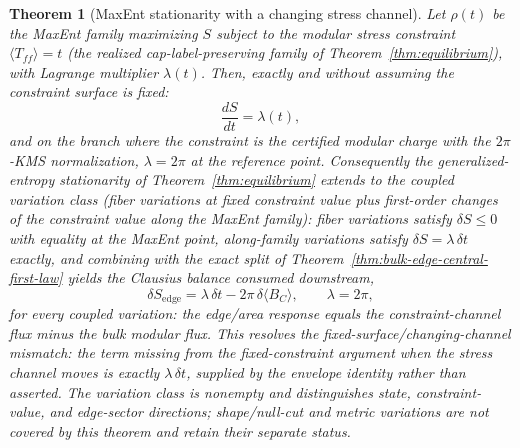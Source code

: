 \documentclass[11pt]{article}
\newtheorem{theorem}{Theorem}[section]
\begin{document}
\begin{theorem}[MaxEnt stationarity with a changing stress channel]
\label{thm:maxent-lagrange-stationarity}
Let \(\rho(t)\) be the MaxEnt family maximizing \(S\) subject to the modular
stress constraint \(\langle T_{ff}\rangle=t\) (the realized cap-label-preserving
family of Theorem~\ref{thm:equilibrium}), with Lagrange multiplier
\(\lambda(t)\). Then, exactly and without assuming the constraint surface is
fixed:
\[
\frac{dS}{dt}=\lambda(t),
\]
and on the branch where the constraint is the certified modular charge with
the \(2\pi\)-KMS normalization, \(\lambda=2\pi\) at the reference point.
Consequently the generalized-entropy stationarity of
Theorem~\ref{thm:equilibrium} extends to the \emph{coupled} variation class
(fiber variations at fixed constraint value \emph{plus} first-order changes
of the constraint value along the MaxEnt family): fiber variations satisfy
\(\delta S\leq0\) with equality at the MaxEnt point, along-family variations
satisfy \(\delta S=\lambda\,\delta t\) exactly, and combining with the exact
split of Theorem~\ref{thm:bulk-edge-central-first-law} yields the Clausius
balance consumed downstream,
\[
\delta S_{\mathrm{edge}}
=\lambda\,\delta t-2\pi\,\delta\langle B_C\rangle ,
\qquad \lambda=2\pi ,
\]
for every coupled variation: the edge/area response equals the
constraint-channel flux minus the bulk modular flux. This resolves the
fixed-surface/changing-channel mismatch: the term missing from the
fixed-constraint argument when the stress channel moves is exactly
\(\lambda\,\delta t\), supplied by the envelope identity rather than
asserted. The variation class
is nonempty and distinguishes state, constraint-value, and edge-sector
directions; shape/null-cut and metric variations are \emph{not} covered by
this theorem and retain their separate status.
\end{theorem}
\end{document}
